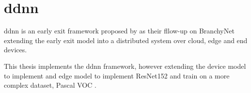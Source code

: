 \section{\acrlong{ddnn}}

\gls{ddnn} is an early exit framework proposed by \citet{teerapittayanon_distributed_2017} as their fllow-up on BranchyNet \cite{teerapittayanon_branchynet:_2016} extending the early exit model into a distributed system over cloud, edge and end devices.

This thesis implements the \gls{ddnn} framework, however extending the device model to implement \cite{sandler_mobilenetv2:_2018} and edge model to implement ResNet152 \cite{he_deep_2015} and train on a more complex dataset, Pascal VOC \cite{everingham_pascal_2010}. 